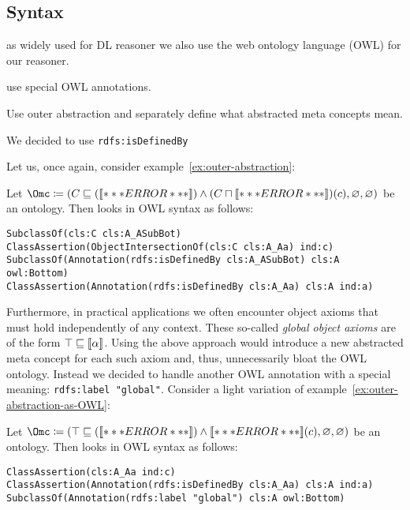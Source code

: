 \clearpage

\subsection{Syntax}
\label{sec:syntax}


as widely used for DL reasoner we also use the web ontology language (OWL) for our reasoner. 

use special OWL annotations.

Use outer abstraction and separately define what abstracted meta concepts mean.


We decided to use \verb+rdfs:isDefinedBy+

Let us, once again, consider example~\ref{ex:outer-abstraction}:
\begin{example}\label{ex:outer-abstraction-as-OWL}
  Let
  $\Omc \coloneqq (C\sqsubseteq(\oax{A\sqsubseteq\bot}) \land (C\sqcap\oax{A(a)})(c), \emptyset,
  \emptyset)$ be an \ALCALC ontology. Then \Omc looks in OWL syntax as follows:

\begin{verbatim}
SubclassOf(cls:C cls:A_ASubBot)
ClassAssertion(ObjectIntersectionOf(cls:C cls:A_Aa) ind:c)
SubclassOf(Annotation(rdfs:isDefinedBy cls:A_ASubBot) cls:A owl:Bottom)
ClassAssertion(Annotation(rdfs:isDefinedBy cls:A_Aa) cls:A ind:a)
\end{verbatim}

\vspace{-2.0\baselineskip}  
\end{example}

Furthermore, in practical applications we often encounter object axioms that must hold independently
of any context. These so-called \emph{global object axioms} are of the form
$\top \sqsubseteq \llbracket\alpha\rrbracket$. Using the above approach would introduce a new abstracted  meta concept for each such axiom and, thus, unnecessarily bloat the OWL
ontology. Instead we decided to handle another OWL annotation with a special meaning:
\verb+rdfs:label "global"+. Consider a light variation of example~\ref{ex:outer-abstraction-as-OWL}:

\begin{example}\label{ex:outer-abstraction-as-OWL-w-global}
  Let $\Omc \coloneqq (\top\sqsubseteq(\oax{A\sqsubseteq\bot}) \land \oax{A(a)}(c), \emptyset, \emptyset)$ be
  an \ALCALC ontology. Then \Omc looks in OWL syntax as follows:

\begin{verbatim}
ClassAssertion(cls:A_Aa ind:c)
ClassAssertion(Annotation(rdfs:isDefinedBy cls:A_Aa) cls:A ind:a)
SubclassOf(Annotation(rdfs:label "global") cls:A owl:Bottom)
\end{verbatim}

\vspace{-2.0\baselineskip}  
\end{example}

